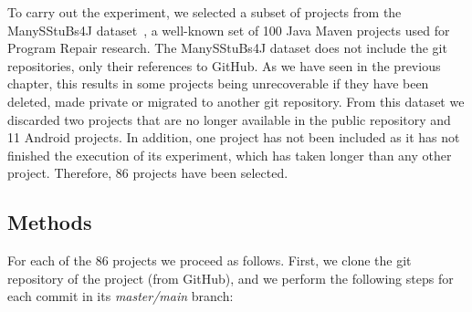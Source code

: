 
To carry out the experiment, we selected a subset of projects from the ManySStuBs4J dataset~\cite{karampatsis2020often}, a well-known set of 100 Java Maven projects used for Program Repair research.
The ManySStuBs4J dataset does not include the git repositories, only their references to GitHub. 
As we have seen in the previous chapter, this results in some projects being unrecoverable if they have been deleted, made private or migrated to another git repository.
From this dataset we discarded two projects that are no longer available in the public repository and 11 Android projects. 
In addition, one project has not been included as it has not finished the execution of its experiment, which has taken longer than any other project.
Therefore, 86 projects have been selected.

\subsection{Methods}
\label{subsec:methods}

For each of the 86 projects we proceed as follows. 
First, we clone the git repository of the project (from GitHub), and we perform the following steps for each commit in its \textit{master/main} branch:

